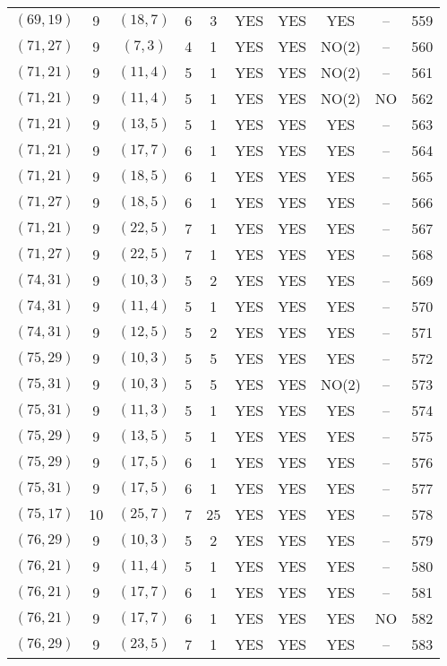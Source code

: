 \begin{longtable}{|c|c|c|c|c|c|c|c|c|c|}
$(69, 19)$ & 9 & $(18, 7)$ & 6 & 3 & YES & YES & YES & -- & 559\\
$(71, 27)$ & 9 & $(7, 3)$ & 4 & 1 & YES & YES & NO(2) & -- & 560\\
$(71, 21)$ & 9 & $(11, 4)$ & 5 & 1 & YES & YES & NO(2) & -- & 561\\
$(71, 21)$ & 9 & $(11, 4)$ & 5 & 1 & YES & YES & NO(2) & NO & 562\\
$(71, 21)$ & 9 & $(13, 5)$ & 5 & 1 & YES & YES & YES & -- & 563\\
$(71, 21)$ & 9 & $(17, 7)$ & 6 & 1 & YES & YES & YES & -- & 564\\
$(71, 21)$ & 9 & $(18, 5)$ & 6 & 1 & YES & YES & YES & -- & 565\\
$(71, 27)$ & 9 & $(18, 5)$ & 6 & 1 & YES & YES & YES & -- & 566\\
$(71, 21)$ & 9 & $(22, 5)$ & 7 & 1 & YES & YES & YES & -- & 567\\
$(71, 27)$ & 9 & $(22, 5)$ & 7 & 1 & YES & YES & YES & -- & 568\\
$(74, 31)$ & 9 & $(10, 3)$ & 5 & 2 & YES & YES & YES & -- & 569\\
$(74, 31)$ & 9 & $(11, 4)$ & 5 & 1 & YES & YES & YES & -- & 570\\
$(74, 31)$ & 9 & $(12, 5)$ & 5 & 2 & YES & YES & YES & -- & 571\\
$(75, 29)$ & 9 & $(10, 3)$ & 5 & 5 & YES & YES & YES & -- & 572\\
$(75, 31)$ & 9 & $(10, 3)$ & 5 & 5 & YES & YES & NO(2) & -- & 573\\
$(75, 31)$ & 9 & $(11, 3)$ & 5 & 1 & YES & YES & YES & -- & 574\\
$(75, 29)$ & 9 & $(13, 5)$ & 5 & 1 & YES & YES & YES & -- & 575\\
$(75, 29)$ & 9 & $(17, 5)$ & 6 & 1 & YES & YES & YES & -- & 576\\
$(75, 31)$ & 9 & $(17, 5)$ & 6 & 1 & YES & YES & YES & -- & 577\\
$(75, 17)$ & 10 & $(25, 7)$ & 7 & 25 & YES & YES & YES & -- & 578\\
$(76, 29)$ & 9 & $(10, 3)$ & 5 & 2 & YES & YES & YES & -- & 579\\
$(76, 21)$ & 9 & $(11, 4)$ & 5 & 1 & YES & YES & YES & -- & 580\\
$(76, 21)$ & 9 & $(17, 7)$ & 6 & 1 & YES & YES & YES & -- & 581\\
$(76, 21)$ & 9 & $(17, 7)$ & 6 & 1 & YES & YES & YES & NO & 582\\
$(76, 29)$ & 9 & $(23, 5)$ & 7 & 1 & YES & YES & YES & -- & 583\\

\end{longtable}
